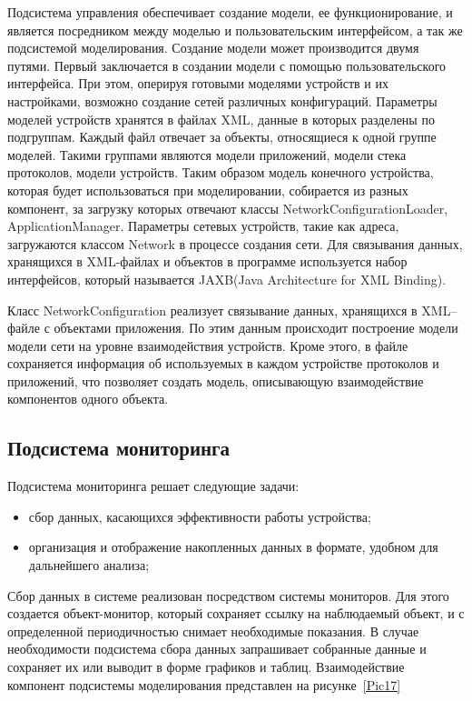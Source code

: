     Подсистема управления обеспечивает создание модели, ее функционирование, и является посредником между моделью и пользовательским интерфейсом, а так же подсистемой моделирования. Создание модели может производится двумя путями. Первый заключается в создании модели с помощью пользовательского интерфейса. При этом, оперируя готовыми моделями устройств и их настройками, возможно создание сетей различных конфигураций. Параметры моделей устройств хранятся в файлах XML, данные в которых разделены по подгруппам. Каждый файл отвечает за объекты, относящиеся к одной группе моделей. Такими группами являются модели приложений, модели стека протоколов, модели устройств. Таким образом модель конечного устройства, которая будет использоваться при моделировании, собирается из разных компонент, за загрузку которых отвечают классы NetworkConfigurationLoader, ApplicationManager. Параметры сетевых устройств, такие как адреса, загружаются классом Network в процессе создания сети. Для связывания данных, хранящихся в XML-файлах и объектов в программе используется набор интерфейсов, который называется JAXB(Java Architecture for XML Binding).

    Класс NetworkConfiguration реализует связывание данных, хранящихся в XML--файле с объектами приложения. По этим данным происходит построение модели модели сети на уровне взаимодействия устройств. Кроме этого, в файле сохраняется информация об используемых в каждом устройстве протоколов и приложений, что позволяет создать модель, описывающую взаимодействие компонентов одного объекта.

    \subsection{Подсистема мониторинга}

    Подсистема мониторинга решает следующие задачи:

    \begin{itemize}
        \item сбор данных, касающихся эффективности работы устройства;
        \item организация и отображение накопленных данных в формате, удобном для дальнейшего анализа;
    \end{itemize}

    Сбор данных в системе реализован посредством системы мониторов. Для этого создается объект-монитор, который сохраняет ссылку на наблюдаемый объект, и с определенной периодичностью снимает необходимые показания. В случае необходимости подсистема сбора данных запрашивает собранные данные и сохраняет их или выводит в форме графиков и таблиц. Взаимодействие компонент подсистемы моделирования представлен на рисунке~\ref{Pic17}

